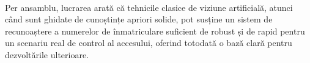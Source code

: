 \paragraph{}
Per ansamblu, lucrarea arată că tehnicile clasice de viziune artificială, atunci când sunt ghidate de cunoștințe apriori solide, pot susține un sistem de recunoaștere a numerelor de înmatriculare suficient de robust și de rapid pentru un scenariu real de control al accesului, oferind totodată o bază clară pentru dezvoltările ulterioare.

